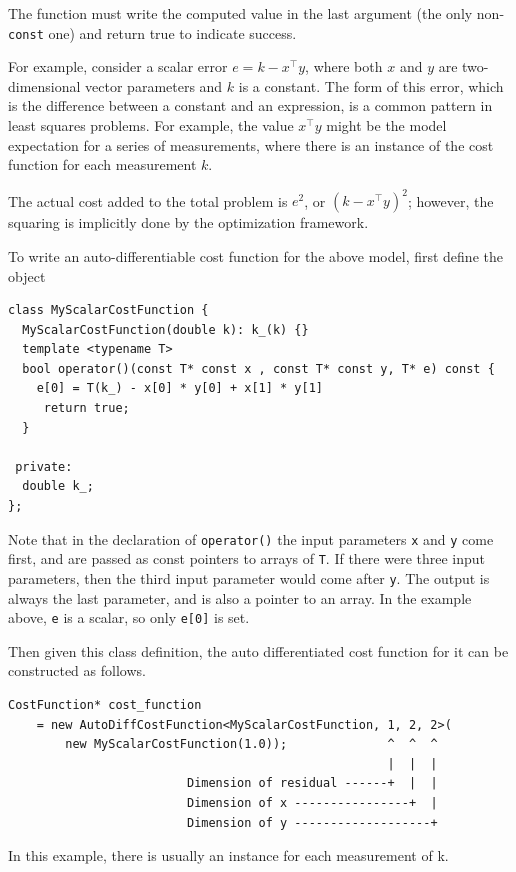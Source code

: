  The function must write the computed value in the last argument (the only
 non-\texttt{const} one) and return true to indicate success.

 For example, consider a scalar error $e = k - x^\top y$, where both $x$ and $y$ are
 two-dimensional vector parameters  and $k$ is a constant. The form of this error, which is the
 difference between a constant and an expression, is a common pattern in least
 squares problems. For example, the value $x^\top y$ might be the model expectation
 for a series of measurements, where there is an instance of the cost function
 for each measurement $k$.

 The actual cost added to the total problem is $e^2$, or $(k - x^\top y)^2$; however,
 the squaring is implicitly done by the optimization framework.

 To write an auto-differentiable cost function for the above model, first
 define the object
\begin{verbatim}
class MyScalarCostFunction {
  MyScalarCostFunction(double k): k_(k) {}
  template <typename T>
  bool operator()(const T* const x , const T* const y, T* e) const {
    e[0] = T(k_) - x[0] * y[0] + x[1] * y[1]
     return true;
  }

 private:
  double k_;
};
\end{verbatim}

Note that in the declaration of \texttt{operator()} the input parameters \texttt{x} and \texttt{y} come
 first, and are passed as const pointers to arrays of \texttt{T}. If there were three
 input parameters, then the third input parameter would come after \texttt{y}. The
 output is always the last parameter, and is also a pointer to an array. In
 the example above, \texttt{e} is a scalar, so only \texttt{e[0]} is set.

 Then given this class definition, the auto differentiated cost function for
 it can be constructed as follows.

\begin{verbatim}
CostFunction* cost_function
    = new AutoDiffCostFunction<MyScalarCostFunction, 1, 2, 2>(
        new MyScalarCostFunction(1.0));              ^  ^  ^
                                                     |  |  |
                         Dimension of residual ------+  |  |
                         Dimension of x ----------------+  |
                         Dimension of y -------------------+
\end{verbatim}

In this example, there is usually an instance for each measurement of k.

